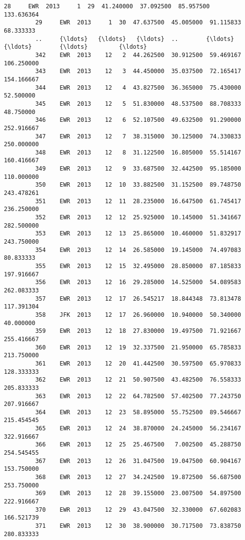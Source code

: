 \documentclass[11pt]{article}
\begin{document}
\begin{Verbatim}[commandchars=\\\{\}]
         28     EWR  2013     1  29  41.240000  37.092500  85.957500  133.636364   
         29     EWR  2013     1  30  47.637500  45.005000  91.115833   68.333333   
         ..     {\ldots}   {\ldots}   {\ldots}  ..        {\ldots}        {\ldots}        {\ldots}         {\ldots}   
         342    EWR  2013    12   2  44.262500  30.912500  59.469167  106.250000   
         343    EWR  2013    12   3  44.450000  35.037500  72.165417  154.166667   
         344    EWR  2013    12   4  43.827500  36.365000  75.430000   52.500000   
         345    EWR  2013    12   5  51.830000  48.537500  88.708333   48.750000   
         346    EWR  2013    12   6  52.107500  49.632500  91.290000  252.916667   
         347    EWR  2013    12   7  38.315000  30.125000  74.330833  250.000000   
         348    EWR  2013    12   8  31.122500  16.805000  55.514167  160.416667   
         349    EWR  2013    12   9  33.687500  32.442500  95.185000  110.000000   
         350    EWR  2013    12  10  33.882500  31.152500  89.748750  243.478261   
         351    EWR  2013    12  11  28.235000  16.647500  61.745417  236.250000   
         352    EWR  2013    12  12  25.925000  10.145000  51.341667  282.500000   
         353    EWR  2013    12  13  25.865000  10.460000  51.832917  243.750000   
         354    EWR  2013    12  14  26.585000  19.145000  74.497083   80.833333   
         355    EWR  2013    12  15  32.495000  28.850000  87.185833  197.916667   
         356    EWR  2013    12  16  29.285000  14.525000  54.089583  262.083333   
         357    EWR  2013    12  17  26.545217  18.844348  73.813478  117.391304   
         358    JFK  2013    12  17  26.960000  10.940000  50.340000   40.000000   
         359    EWR  2013    12  18  27.830000  19.497500  71.921667  255.416667   
         360    EWR  2013    12  19  32.337500  21.950000  65.785833  213.750000   
         361    EWR  2013    12  20  41.442500  30.597500  65.970833  128.333333   
         362    EWR  2013    12  21  50.907500  43.482500  76.558333  205.833333   
         363    EWR  2013    12  22  64.782500  57.402500  77.243750  207.916667   
         364    EWR  2013    12  23  58.895000  55.752500  89.546667  215.454545   
         365    EWR  2013    12  24  38.870000  24.245000  56.234167  322.916667   
         366    EWR  2013    12  25  25.467500   7.002500  45.288750  254.545455   
         367    EWR  2013    12  26  31.047500  19.047500  60.904167  153.750000   
         368    EWR  2013    12  27  34.242500  19.872500  56.687500  253.750000   
         369    EWR  2013    12  28  39.155000  23.007500  54.897500  222.916667   
         370    EWR  2013    12  29  43.047500  32.330000  67.602083  166.521739   
         371    EWR  2013    12  30  38.900000  30.717500  73.838750  280.833333   
         

\end{Verbatim}
\end{document}
